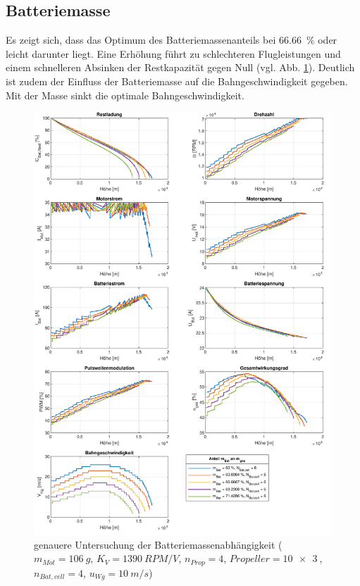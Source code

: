 \begin{appendix}
\section{Batteriemasse}
\label{sec:batteriemasse}
Es zeigt sich, dass das Optimum des Batteriemassenanteils bei \SI{66.66}{\%} oder leicht darunter liegt. Eine Erhöhung führt zu schlechteren Flugleistungen und einem schnelleren Absinken der Restkapazität gegen Null (vgl. Abb. \ref{abb:batteriemasse_genauer}). Deutlich ist zudem der Einfluss der Batteriemasse auf die Bahngeschwindigkeit gegeben. Mit der Masse sinkt die optimale Bahngeschwindigkeit. 
\begin{figure}[H]
\centering
	\includegraphics[scale=0.7]{Diagramme/Batteriemasse_genauer.pdf}
	\caption{genauere Untersuchung der Batteriemassenabhängigkeit (\ensuremath{m_{Mot}=\SI{106}{g}}, \ensuremath{K_V=\SI{1390}{RPM/V}}, \ensuremath{n_{Prop}=4}, \ensuremath{Propeller=\SI{10x3}{}}, \ensuremath{n_{Bat,cell}=4}, \ensuremath{u_{Wg}=\SI{10}{m/s}})}
	\label{abb:batteriemasse_genauer}
\end{figure}





\end{appendix}
